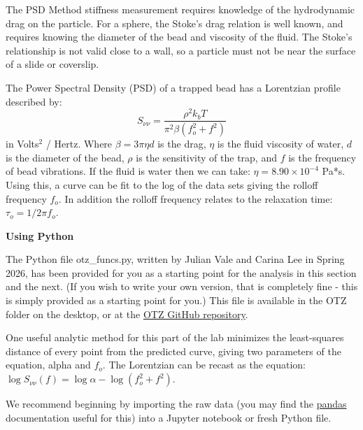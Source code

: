 \documentclass{../lab}
\begin{document}
The PSD Method stiffness measurement requires knowledge of the hydrodynamic drag on the particle. For a sphere, the Stoke's drag relation is well known, and requires knowing the diameter of the bead and viscosity of the fluid. The Stoke's relationship is not valid close to a wall, so a particle must not be near the surface of a slide or coverslip.

The Power Spectral Density (PSD) \cite{Reif} of a trapped bead has a Lorentzian profile described by:
\begin{equation}
    S_{\nu\nu} = \frac{\rho^2 k_b T}{\pi^2 \beta(f_o^2+f^2)}
\end{equation}
in Volts$^2$ / Hertz. Where $\beta = 3\pi\eta d$ is the drag, $\eta$ is the fluid viscosity of water, $d$ is the diameter of the bead, $\rho$ is the sensitivity of the trap, and $f$ is the frequency of bead vibrations. If the fluid is water then we can take: $\eta = 8.90 \times 10^{-4}$ Pa*s. Using this, a curve can be fit to the log of the data sets giving the rolloff frequency $f_o$. In addition the rolloff frequency relates to the relaxation time: $\tau_o = 1/2\pi f_o$.

\textbf{Using Python}

The Python file otz\_funcs.py, written by Julian Vale and Carina Lee in Spring 2026, has been provided for you as a starting point for the analysis in this section and the next. (If you wish to write your own version, that is completely fine - this is simply provided as a starting point for you.) This file is available in the OTZ folder on the desktop, or at the \href{https://github.com/berkeley-physics111b/OTZ/blob/main/otz_funcs.py}{OTZ GitHub repository}.

One useful analytic method for this part of the lab minimizes the least-squares distance of every point from the predicted curve, giving two parameters of the equation, alpha and $f_o$. The Lorentzian can be recast as the equation: $\log{S_{\nu\nu}(f)} = \log{\alpha} - \log{(f_o^2+f^2)}$.

We recommend beginning by importing the raw data (you may find the \href{https://pandas.pydata.org/docs/getting_started/intro_tutorials/02_read_write.html}{pandas} documentation useful for this) into a Jupyter notebook or fresh Python file. 


\end{document}
